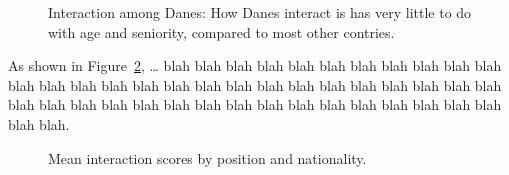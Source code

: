 \documentclass[
  a4paper,
]{scrbook}
\begin{document}
\begin{figure}[H]


\caption{\label{fig-danish-interaction}Interaction among Danes: How
Danes interact is has very little to do with age and seniority, compared
to most other contries.}

\end{figure}%

As shown in Figure~\ref{fig-meaninformality}, \ldots{} blah blah blah
blah blah blah blah blah blah blah blah blah blah blah blah blah blah
blah blah blah blah blah blah blah blah blah blah blah blah blah blah
blah blah blah blah blah blah blah blah blah blah blah blah blah blah.

\begin{figure}[H]


\caption{\label{fig-meaninformality}Mean interaction scores by position
and nationality.}

\end{figure}%
\end{document}
